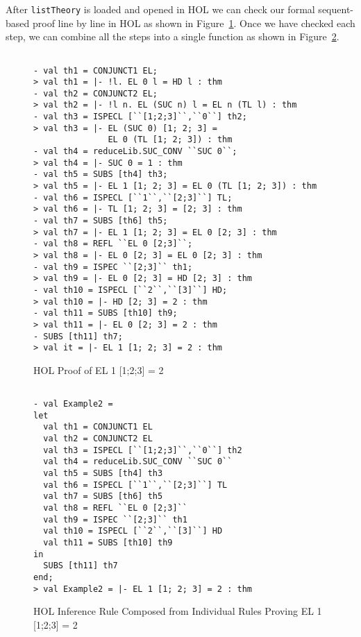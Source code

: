 After \texttt{listTheory} is loaded and opened in HOL we can check our
formal sequent-based proof line by line in HOL as shown in
Figure~\ref{fig:hol-proof-3}.  Once we have checked each step, we can combine all the steps into a single function as shown in Figure~\ref{fig:hol-proof-4}.

\begin{figure}[t]
  \centering
  \begin{session}
\begin{verbatim}

- val th1 = CONJUNCT1 EL;
> val th1 = |- !l. EL 0 l = HD l : thm
- val th2 = CONJUNCT2 EL;
> val th2 = |- !l n. EL (SUC n) l = EL n (TL l) : thm
- val th3 = ISPECL [``[1;2;3]``,``0``] th2;
> val th3 = |- EL (SUC 0) [1; 2; 3] = 
               EL 0 (TL [1; 2; 3]) : thm
- val th4 = reduceLib.SUC_CONV ``SUC 0``;
> val th4 = |- SUC 0 = 1 : thm
- val th5 = SUBS [th4] th3;
> val th5 = |- EL 1 [1; 2; 3] = EL 0 (TL [1; 2; 3]) : thm
- val th6 = ISPECL [``1``,``[2;3]``] TL;
> val th6 = |- TL [1; 2; 3] = [2; 3] : thm
- val th7 = SUBS [th6] th5;
> val th7 = |- EL 1 [1; 2; 3] = EL 0 [2; 3] : thm
- val th8 = REFL ``EL 0 [2;3]``;
> val th8 = |- EL 0 [2; 3] = EL 0 [2; 3] : thm
- val th9 = ISPEC ``[2;3]`` th1;
> val th9 = |- EL 0 [2; 3] = HD [2; 3] : thm
- val th10 = ISPECL [``2``,``[3]``] HD;
> val th10 = |- HD [2; 3] = 2 : thm
- val th11 = SUBS [th10] th9;
> val th11 = |- EL 0 [2; 3] = 2 : thm
- SUBS [th11] th7;
> val it = |- EL 1 [1; 2; 3] = 2 : thm
\end{verbatim}
  \end{session}
  \caption{HOL Proof of EL 1 [1;2;3] = 2}
  \label{fig:hol-proof-3}
\end{figure}

\begin{figure}[t]
  \centering
  \begin{session}
\begin{verbatim}

- val Example2 =
let
  val th1 = CONJUNCT1 EL
  val th2 = CONJUNCT2 EL
  val th3 = ISPECL [``[1;2;3]``,``0``] th2
  val th4 = reduceLib.SUC_CONV ``SUC 0``
  val th5 = SUBS [th4] th3
  val th6 = ISPECL [``1``,``[2;3]``] TL
  val th7 = SUBS [th6] th5
  val th8 = REFL ``EL 0 [2;3]``
  val th9 = ISPEC ``[2;3]`` th1
  val th10 = ISPECL [``2``,``[3]``] HD
  val th11 = SUBS [th10] th9
in
  SUBS [th11] th7
end;
> val Example2 = |- EL 1 [1; 2; 3] = 2 : thm
\end{verbatim}
  \end{session}
  \caption{HOL Inference Rule Composed from Individual Rules Proving
    EL 1 [1;2;3] = 2}
  \label{fig:hol-proof-4}
\end{figure}

